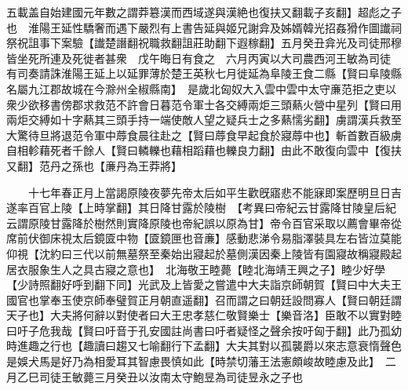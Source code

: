 五載盖自始建國元年數之謂莽簒漢而西域遂與漢絶也復扶又翻載子亥翻】超彪之子也　淮陽王延性驕奢而遇下嚴烈有上書告延與姬兄謝弇及姊婿韓光招姦猾作圖䜟祠祭祝詛事下案驗【䜟楚譖翻祝職救翻詛莊助翻下遐稼翻】五月癸丑弇光及司徒邢穆皆坐死所連及死徙者甚衆　戊午晦日有食之　六月丙寅以大司農西河王敏為司徒　有司奏請誅淮陽王延上以延罪薄於楚王英秋七月徙延為阜陵王食二縣【賢曰阜陵縣名屬九江郡故城在今滁州全椒縣南】　是歲北匈奴大入雲中雲中太守亷范拒之吏以衆少欲移書傍郡求救范不許會日暮范令軍士各交縛兩炬三頭爇火營中星列【賢曰用兩炬交縛如十字爇其三頭手持一端使敵人望之疑兵士之多爇懦劣翻】虜謂漢兵救至大驚待旦將退范令軍中蓐食晨往赴之【賢曰蓐食早起食於寢蓐中也】斬首數百級虜自相軫藉死者千餘人【賢曰轔轢也藉相蹈藉也轢良力翻】由此不敢復向雲中【復扶又翻】范丹之孫也【亷丹為王莽將】

　　十七年春正月上當謁原陵夜夢先帝太后如平生歡旣寤悲不能寐即案歷明旦日吉遂率百官上陵【上時掌翻】其日降甘露於陵樹　【考異曰帝紀云甘露降甘陵皇后紀云謂原陵甘露降於樹然則實降原陵也帝紀誤以原為甘】帝令百官采取以薦會畢帝從席前伏御床視太后鏡匳中物【匳鏡匣也音亷】感動悲涕令易脂澤裝具左右皆泣莫能仰視【沈約曰三代以前無墓祭至秦始出寢起於墓側漢因秦上陵皆有園寢故稱寢殿起居衣服象生人之具古寢之意也】　北海敬王睦薨【睦北海靖王興之子】睦少好學【少詩照翻好呼到翻下同】光武及上皆愛之嘗遣中大夫詣京師朝賀【賢曰中大夫王國官也掌奉玉使京師奉璧賀正月朝直遥翻】召而謂之曰朝廷設問寡人【賢曰朝廷謂天子也】大夫將何辭以對使者曰大王忠孝慈仁敬賢樂士【樂音洛】臣敢不以實對睦曰吁子危我哉【賢曰吁音于孔安國註尚書曰吁者疑怪之聲余按吁匈于翻】此乃孤幼時進趣之行也【趣讀曰趨又七喻翻行下孟翻】大夫其對以孤襲爵以來志意衰惰聲色是娛犬馬是好乃為相愛耳其智慮畏慎如此【時禁切藩王法憲頗峻故睦慮及此】　二月乙巳司徒王敏薨三月癸丑以汝南太守鮑昱為司徒昱永之子也

